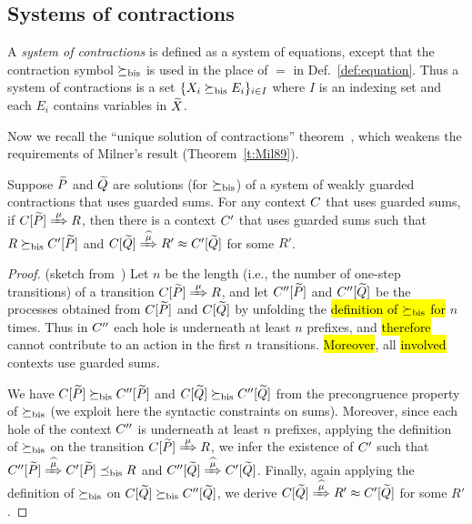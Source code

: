 \subsection{Systems of contractions}
\label{ss:SysContr}

A \emph{system of contractions} is defined as a system of equations,
except that the contraction symbol $\mathrel{\succeq_{\rm{bis}}}$ is used in the place of
$=$ in Def.~\ref{def:equation}. Thus a system of contractions is a set 
$\{  X_i \mathrel{\succeq_{\rm{bis}}} E_i\}_{i\in I}$ where $I$ is an indexing set and each
$E_i$  contains variables in $\widetilde X$.

Now we recall the ``unique solution of
contractions'' theorem~\cite{sangiorgi2017equations},
which weakens the requirements of Milner's result
(Theorem~\ref{t:Mil89}).

\begin{lemma}
\label{l:uptocon}
Suppose $\widetilde P$ and $\widetilde Q$ are solutions (for $\mathrel{\succeq_{\rm{bis}}}$)
 of a system of weakly guarded contractions that uses guarded sums.
For any context $C$  that uses guarded sums,
if $\ct{\til P}\Arr{\mu}  R$, then there is a context $C'$ that uses 
guarded sums
such that $R \mathrel{\succeq_{\rm{bis}}} C' [\widetilde P]$ and $\ct{\til Q} \Arcap{\mu} R'
 \wb \ctp{\til Q}$ for some $R'$.
\end{lemma}

\begin{proof}{(sketch from~\cite{sangiorgi2017equations})}
  Let $n$ be the length (i.e., the number of one-step transitions) of
a transition $\ct{\til P}\Arr\mu R$, and
let $C'' [\widetilde P]$ and $C'' [\widetilde Q]$  be the processes obtained
from  $C [\widetilde P]$ and $C [\widetilde Q]$ by unfolding the \hl{definition
of $\mathrel{\succeq_{\rm{bis}}}$ for} $n$ times. Thus in $C''$ each hole is
underneath at least $n$ prefixes, and \hl{therefore} cannot contribute to an action
in the first $n$ transitions. \hl{Moreover}, all \hl{involved} contexts use guarded sums.

We have $C [\widetilde P] \mathrel{\succeq_{\rm{bis}}} C'' [\widetilde P]$ and 
$C [\widetilde Q] \mathrel{\succeq_{\rm{bis}}} C'' [\widetilde Q]$
 from the precongruence property of $\mathrel{\succeq_{\rm{bis}}}$ (we exploit here
 the syntactic constraints on sums). Moreover,
 since each hole of the  context $C''$ is underneath at least $n$
 prefixes, applying the definition
 of $\mathrel{\succeq_{\rm{bis}}}$ on the transition 
 $\ct{\til P}\Arr{\mu}  R$, we infer the existence
 of $C'$ such that 
$\ctpp{\til P}\Arcap{\mu} \ctp{\til P} \mexpaBIS R$
and 
$\ctpp{\til Q}\Arcap{\mu}  \ctp{\til Q}$.
Finally, again applying the definition of $\mathrel{\succeq_{\rm{bis}}}$ on 
$C [\widetilde Q] \mathrel{\succeq_{\rm{bis}}} C'' [\widetilde Q]$, 
we derive 
$\ct{\til Q}\Arcap{\mu} R' \wb \ctp{\til Q}$ for some $R'$.
\end{proof}

